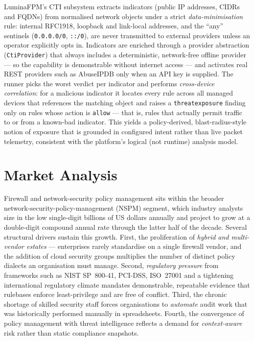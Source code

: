 \documentclass[12pt,a4paper]{report}
\renewcommand{\_}{\textunderscore\allowbreak}
\begin{document}
LuminaFPM's CTI subsystem extracts indicators (public IP addresses, CIDRs and FQDNs) from normalised network objects under a strict \emph{data-minimisation} rule: internal RFC1918, loopback and link-local addresses, and the ``any'' sentinels (\texttt{0.0.0.0/0}, \texttt{::/0}), are never transmitted to external providers unless an operator explicitly opts in. Indicators are enriched through a provider abstraction (\texttt{CtiProvider}) that always includes a deterministic, network-free offline provider --- so the capability is demonstrable without internet access --- and activates real REST providers such as AbuseIPDB only when an API key is supplied. The runner picks the worst verdict per indicator and performs \emph{cross-device correlation}: for a malicious indicator it locates every rule across all managed devices that references the matching object and raises a \texttt{threat\_exposure} finding only on rules whose action is \texttt{allow} --- that is, rules that actually permit traffic to or from a known-bad indicator. This yields a policy-derived, blast-radius-style notion of exposure that is grounded in configured intent rather than live packet telemetry, consistent with the platform's logical (not runtime) analysis model.

\section{Market Analysis}
\label{sec:ch2-market}
Firewall and network-security policy management sits within the broader network-security-policy-management (NSPM) segment, which industry analysts size in the low single-digit billions of US dollars annually and project to grow at a double-digit compound annual rate through the latter half of the decade. Several structural drivers sustain this growth. First, the proliferation of \emph{hybrid and multi-vendor estates} --- enterprises rarely standardise on a single firewall vendor, and the addition of cloud security groups multiplies the number of distinct policy dialects an organisation must manage. Second, \emph{regulatory pressure} from frameworks such as NIST SP~800-41, PCI-DSS, ISO~27001 and a tightening international regulatory climate mandates demonstrable, repeatable evidence that rulebases enforce least-privilege and are free of conflict. Third, the chronic shortage of skilled security staff forces organisations to \emph{automate} audit work that was historically performed manually in spreadsheets. Fourth, the convergence of policy management with threat intelligence reflects a demand for \emph{context-aware} risk rather than static compliance snapshots.
\end{document}

